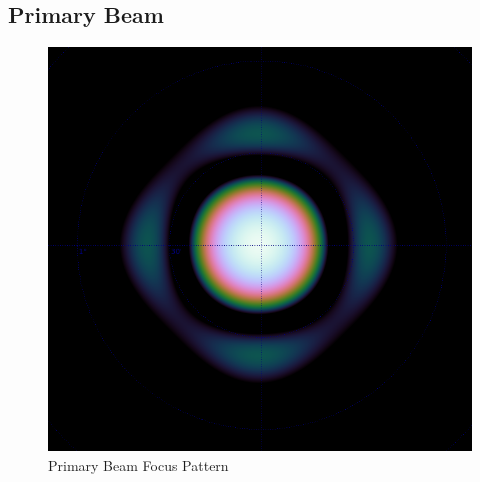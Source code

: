 \newpage


\begin{appendix}
\section{Primary Beam}
\begin{figure}[H]
	\centering
	\label{beam}
	\includegraphics[scale=0.28]{1_Introduction/beam.png}
	\caption{Primary Beam Focus Pattern\cite{oleg}}
\end{figure}

\end{appendix}
